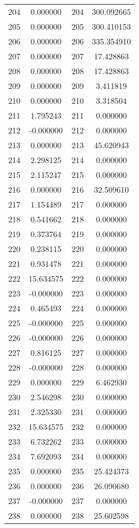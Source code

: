 \documentclass[12pt]{article}
\begin{document}
\begin{longtable}{@{}cccc@{}}
204 & 0.000000 & 204 & 300.092665 \\
205 & 0.000000 & 205 & 300.410153 \\
206 & 0.000000 & 206 & 335.354910 \\
207 & 0.000000 & 207 & 17.428863 \\
208 & 0.000000 & 208 & 17.428863 \\
209 & 0.000000 & 209 & 3.411819 \\
210 & 0.000000 & 210 & 3.318504 \\
211 & 1.795243 & 211 & 0.000000 \\
212 & -0.000000 & 212 & 0.000000 \\
213 & 0.000000 & 213 & 45.620943 \\
214 & 2.298125 & 214 & 0.000000 \\
215 & 2.115247 & 215 & 0.000000 \\
216 & 0.000000 & 216 & 32.509610 \\
217 & 1.154489 & 217 & 0.000000 \\
218 & 0.541662 & 218 & 0.000000 \\
219 & 0.373764 & 219 & 0.000000 \\
220 & 0.238115 & 220 & 0.000000 \\
221 & 0.931478 & 221 & 0.000000 \\
222 & 15.634575 & 222 & 0.000000 \\
223 & -0.000000 & 223 & 0.000000 \\
224 & 0.465493 & 224 & 0.000000 \\
225 & -0.000000 & 225 & 0.000000 \\
226 & -0.000000 & 226 & 0.000000 \\
227 & 0.816125 & 227 & 0.000000 \\
228 & -0.000000 & 228 & 0.000000 \\
229 & 0.000000 & 229 & 6.462930 \\
230 & 2.546298 & 230 & 0.000000 \\
231 & 2.325330 & 231 & 0.000000 \\
232 & 15.634575 & 232 & 0.000000 \\
233 & 6.732262 & 233 & 0.000000 \\
234 & 7.692093 & 234 & 0.000000 \\
235 & 0.000000 & 235 & 25.424373 \\
236 & 0.000000 & 236 & 26.090680 \\
237 & -0.000000 & 237 & 0.000000 \\
238 & 0.000000 & 238 & 25.602598 \\

\end{longtable}
\end{document}

